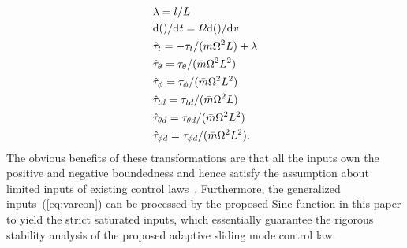 \documentclass[3p]{elsarticle}
\theoremstyle{plain}
\theoremstyle{remark}
\begin{document}
\begin{align}
\begin{split}
&\lambda=l/L\\
&\rm{d}\it{()}/\rm{d}\it{t}=\Omega \rm{d}\it{()}/\rm{d}\it{v}\\
&\hat{\tau}_t=-\tau_t/(\bar{m}\Omega^2L)+\lambda\\
&\hat{\tau}_\theta=\tau_\theta/(\bar{m}\Omega^2L^2)\\
&\hat{\tau}_\phi = \tau_\phi/(\bar{m}\Omega^2L^2)\\
&\hat{\tau}_{td}=\tau_{td}/(\bar{m}\Omega^2L)\\
&\hat{\tau}_{\theta d}=\tau_{\theta d}/(\bar{m}\Omega^2L^2)\\
&\hat{\tau}_{\phi d}= \tau_{\phi d}/(\bar{m}\Omega^2L^2)\label{eq:varcon}.
\end{split}
\end{align}
The obvious benefits of these transformations are that all the inputs own the positive and negative boundedness and hence satisfy the assumption about limited inputs of existing control laws~\cite{Hu2008552,6060930}. Furthermore, the generalized inputs~(\ref{eq:varcon}) can be processed by the proposed Sine function in this paper to yield the strict saturated inputs, which essentially guarantee the rigorous stability analysis of the proposed adaptive sliding mode control law.
\end{document}
